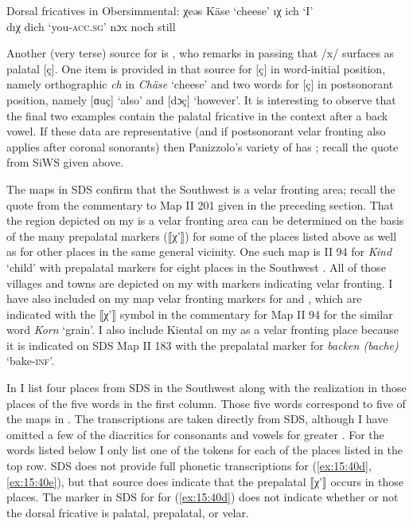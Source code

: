 \ea%
\label{ex:15:39}Dorsal fricatives in Obersimmental:
\ea\label{ex:15:39a} χeəs \tab [çeəs] \tab Käse \tab ‘cheese’ 
\ex\label{ex:15:39b} ıχ \tab  [ɪç] \tab ich \tab ‘I’ \\
    dıχ \tab  [dɪç] \tab dich \tab ‘you-\textsc{acc}.\textsc{sg}’ 
\ex\label{ex:15:39c} nɔx \tab  [nɔx] \tab noch \tab still 
\z 
\z 

Another (very terse) source for  is \citet[26]{Panizzolo1982}, who remarks in passing that /x/ surfaces as palatal [ç]. One item is provided in that source for [ç] in word-initial position, namely orthographic \textit{ch} in \textit{Chäse} ‘cheese’ and two words for [ç] in postsonorant position, namely [ɑuç] ‘also’ and [dɔç] ‘however’. It is interesting to observe that the final two examples contain the palatal fricative in the context after a back vowel. If these data are representative (and if postsonorant velar fronting also applies after coronal sonorants) then Panizzolo’s variety of  has ; recall the quote from SiWS given above.

The maps in SDS confirm that the Southwest  is a velar fronting area; recall the quote from the commentary to Map II 201 given in the preceding section. That the region depicted on my  is a velar fronting area can be determined on the basis of the many prepalatal markers (⟦χ'⟧) for some of the places listed above as well as for other places in the same general vicinity. One such map is II 94 for \textit{Kind} ‘child’ with prepalatal markers for eight places in the Southwest . All of those villages and towns are depicted on my  with markers indicating velar fronting. I have also included on my map velar fronting markers for  and , which are indicated with the ⟦χ'⟧ symbol in the commentary for Map II 94 for the similar word \textit{Korn} ‘grain’. I also include Kiental on my  as a velar fronting place because it is indicated on SDS Map II 183 with the prepalatal marker for \textit{backen (bache)} ‘bake-\textsc{inf}’.

In  I list four places from SDS in the Southwest  along with the realization in those places of the five words in the first column. Those five words correspond to five of the maps in . The transcriptions are taken directly from SDS, although I have omitted a few of the diacritics for consonants and vowels for greater . For the words listed below I only list one of the tokens for each of the places listed in the top row. SDS does not provide full phonetic transcriptions for (\ref{ex:15:40d}, \ref{ex:15:40e}), but that source does indicate that the prepalatal ⟦χ'⟧ occurs in those places. The marker in SDS for  for (\ref{ex:15:40d}) does not indicate whether or not the dorsal fricative is palatal, prepalatal, or velar.


